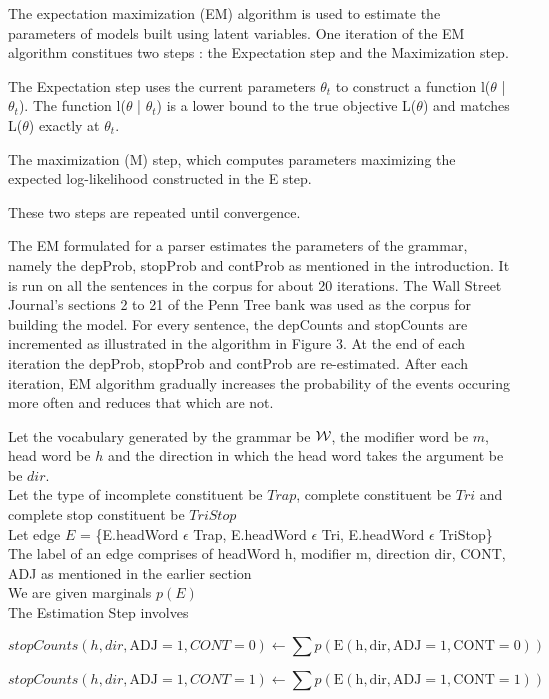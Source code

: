 \documentclass{article}
\begin{document}
The expectation maximization (EM) algorithm is used to estimate the parameters of models built using latent variables. One iteration of the EM algorithm constitues two steps : the Expectation step and the Maximization step. 

The Expectation step uses the current parameters $\theta_t$ to construct a function l($\theta$ | $\theta_t$). The function l($\theta$ | $\theta_t$) is a lower bound to the true objective L($\theta$) and matches L($\theta$) exactly at $\theta_t$.

The maximization (M) step, which computes parameters maximizing the expected log-likelihood constructed in the E step.

These two steps are repeated until convergence.

The EM formulated for a parser estimates the parameters of the grammar, namely the depProb, stopProb and contProb as mentioned in the introduction. It is run on all the sentences in the corpus for about 20 iterations. The Wall Street Journal's sections 2 to 21 of the Penn Tree bank was used as the corpus for building the model. For every sentence, the depCounts and stopCounts are incremented as illustrated in the algorithm in Figure 3. At the end of each iteration the depProb, stopProb and contProb are re-estimated. After each iteration, EM algorithm gradually increases the probability of the events occuring more often and reduces that which are not.

Let the vocabulary generated by the grammar be ${\cal W}$, the modifier word be $m$, head word be $h$ and the direction in which the head word takes the argument be be $dir$. \\
Let the type of incomplete constituent be $Trap$, complete constituent be $Tri$ and complete stop constituent be $TriStop$ \\
Let edge $E$ = \{E.headWord $\epsilon$ Trap, E.headWord $\epsilon$ Tri, E.headWord $\epsilon$ TriStop\} \\
The label of an edge comprises of headWord h, modifier m, direction dir, CONT, ADJ as mentioned in the earlier section \\
We are given marginals $p(E)$ \\

The Estimation Step involves

 \[stopCounts(h, dir, \mathrm{ADJ}= 1, CONT = 0) \gets 
  \sum p(\mathrm{E(h, dir, ADJ=1, CONT = 0)}) \]

 \[stopCounts(h, dir, \mathrm{ADJ}= 1, CONT = 1) \gets 
  \sum p(\mathrm{E(h, dir, ADJ=1, CONT = 1)}) \]
\end{document}
